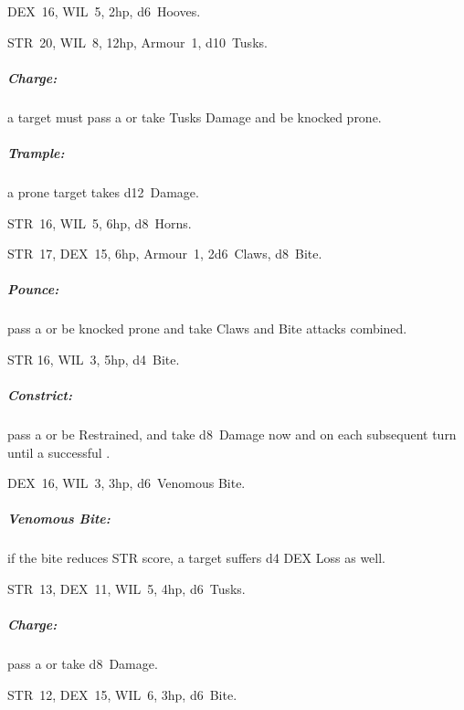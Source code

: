 \documentclass[itdr]{subfiles}
\begin{document}
\vfill

DEX~16, WIL~5, 2hp, d6~Hooves.

\vfill

STR~20, WIL~8, 12hp, Armour~1, d10~Tusks.
\subparagraph{Charge:} a target must pass a  or take Tusks Damage and be knocked prone.
\subparagraph{Trample:} a prone target takes d12~Damage.

\vfill

STR~16, WIL~5, 6hp, d8~Horns.

\vfill

STR~17, DEX~15, 6hp, Armour~1, 2d6~Claws, d8~Bite.
\subparagraph{Pounce:} pass a  or be knocked prone and take Claws and Bite attacks combined.

\vfill

STR 16, WIL~3, 5hp, d4~Bite.
\subparagraph{Constrict:} pass a  or be Restrained, and take d8~Damage now and on each subsequent turn until a successful .

\vfill

DEX~16, WIL~3, 3hp, d6~Venomous Bite.
\subparagraph{Venomous Bite:} if the bite reduces STR score, a target suffers d4 DEX Loss as well.

\vfill

STR~13, DEX~11, WIL~5, 4hp, d6~Tusks.
\subparagraph{Charge:} pass a  or take d8~Damage.

\vfill

STR~12, DEX~15, WIL~6, 3hp, d6~Bite.

\vfill
~
\end{document}
